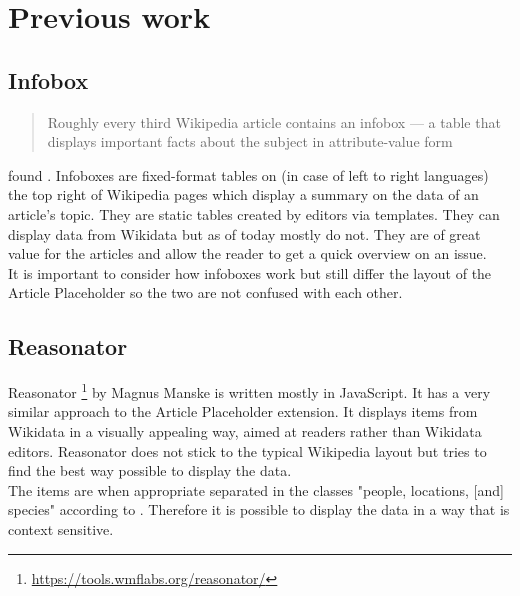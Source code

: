 \chapter{Previous work}
\section{Infobox}
\begin{quote}
	Roughly every third Wikipedia article contains an infobox --- a table that displays important facts about the subject in attribute-value form
\end{quote}
found \citet[5]{infobox}. Infoboxes are fixed-format tables on (in case of left to right languages) the top right of Wikipedia pages which display a summary on the data of an article's topic. \citep{wiki:05} They are static tables created by editors via templates. They can display data from Wikidata but as of today mostly do not. They are of great value for the articles and allow the reader to get a quick overview on an issue. \\
It is important to consider how infoboxes work but still differ the layout of the Article Placeholder so the two are not confused with each other.

\section{Reasonator}
Reasonator \footnote{\url{https://tools.wmflabs.org/reasonator/}} by Magnus Manske is written mostly in JavaScript. It has a very similar approach to the Article Placeholder extension. It displays items from Wikidata in a visually appealing way, aimed at readers rather than Wikidata editors. Reasonator does not stick to the typical Wikipedia layout but tries to find the best way possible to display the data. \\
The items are when appropriate separated in the classes  "people, locations, [and] species" according to \citet{wiki:06}. Therefore it is possible to display the data in a way that is context sensitive. \\

